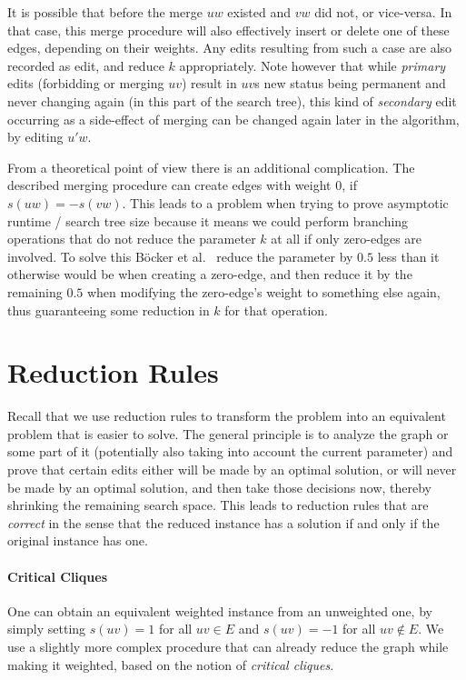 \documentclass[12pt,oneside,english,parskip=full,headings=small]{scrbook}
\theoremstyle{definition}
\begin{document}
It is possible that before the merge $uw$ existed and $vw$ did not, or vice-versa. In that case,
this merge procedure will also effectively insert or delete one of these edges, depending on their
weights. Any edits resulting from such a case are also recorded as edit, and reduce $k$
appropriately. Note however that while \emph{primary} edits (forbidding or merging $uv$) result in
$uv$s new status being permanent and never changing again (in this part of the search tree), this
kind of \emph{secondary} edit occurring as a side-effect of merging can be changed again later in
the algorithm, by editing $u'w$.

From a theoretical point of view there is an additional complication. The described merging
procedure can create edges with weight $0$, if $s(uw) = -s(vw)$. This leads to a problem when trying
to prove asymptotic runtime / search tree size because it means we could perform branching
operations that do not reduce the parameter $k$ at all if only zero-edges are involved. To solve
this Böcker et al.~\cite{GoingWeighted} reduce the parameter by $0.5$ less than it otherwise would
be when creating a zero-edge, and then reduce it by the remaining $0.5$ when modifying the
zero-edge's weight to something else again, thus guaranteeing some reduction in $k$ for that
operation.

\section{Reduction Rules}
\label{sec:reduction}

Recall that we use reduction rules to transform the problem into an equivalent problem that is
easier to solve. The general principle is to analyze the graph or some part of it (potentially also
taking into account the current parameter) and prove that certain edits either will be made by an
optimal solution, or will never be made by an optimal solution, and then take those decisions now,
thereby shrinking the remaining search space. This leads to reduction rules that are \emph{correct}
in the sense that the reduced instance has a solution if and only if the original instance has one.

\paragraph{Critical Cliques} One can obtain an equivalent weighted instance from an unweighted one,
by simply setting $s(uv) = 1$ for all $uv \in E$ and $s(uv) = -1$ for all $uv \notin E$. We use a
slightly more complex procedure that can already reduce the graph while making it weighted, based on
the notion of \emph{critical cliques}.
\end{document}
